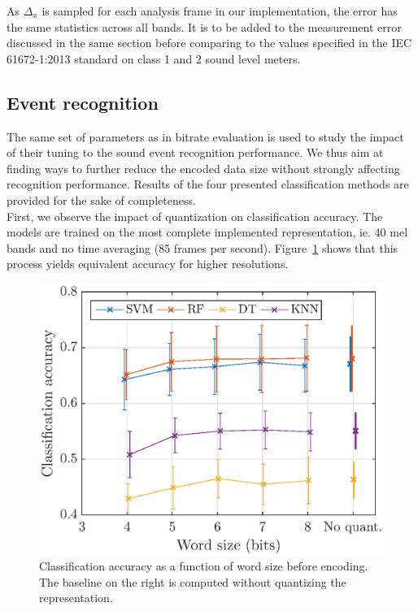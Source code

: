 \documentclass[final,3p,times,twocolumn]{elsarticle}
\begin{document}
As $\Delta_x$ is sampled for each analysis frame in our implementation, the error has the same statistics across all bands. It is to be added to the measurement error discussed in the same section before comparing to the values specified in the IEC 61672-1:2013 \cite{iec-norm2} standard on class 1 and 2 sound level meters.

\subsection{Event recognition}

The same set of parameters as in bitrate evaluation is used to study the impact of their tuning to the sound event recognition performance. We thus aim at finding ways to further reduce the encoded data size without strongly affecting recognition performance. Results of the four presented classification methods are provided for the sake of completeness.\\

First, we observe the impact of quantization on classification accuracy. The models are trained on the most complete implemented representation, ie. 40 mel bands and no time averaging (85 frames per second). Figure~\ref{fig:class_mel_q} shows that this process yields equivalent accuracy for higher resolutions.\\

\begin{figure}[htbp]
	\centering
		\includegraphics[width=\columnwidth]{figures/class_mel_q.eps}
	\caption{Classification accuracy as a function of word size before encoding. The baseline on the right is computed without quantizing the representation.}
	\label{fig:class_mel_q}
\end{figure}
\end{document}
